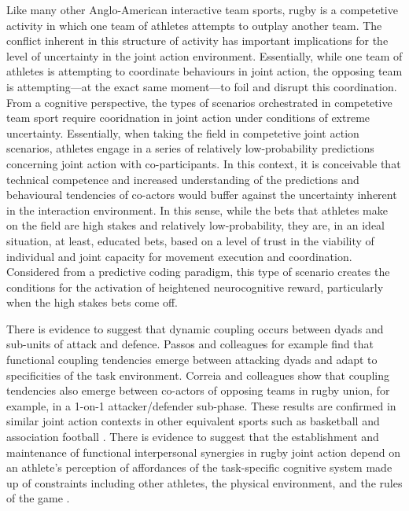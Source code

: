 Like many other Anglo-American interactive team sports, rugby is a competetive activity in which one team of athletes attempts to outplay another team.  The conflict inherent in this structure of activity has important implications for the level of uncertainty in the joint action environment.  Essentially, while one team of athletes is attempting to coordinate behaviours in joint action, the opposing team is attempting---at the exact same moment---to foil and disrupt this coordination.  From a cognitive perspective, the types of scenarios orchestrated in competetive team sport require cooridnation in joint action under conditions of extreme uncertainty.  Essentially, when taking the field in competetive joint action scenarios, athletes engage in a series of relatively low-probability predictions concerning joint action with co-participants.  In this context, it is conceivable that technical competence and increased understanding of the predictions and behavioural tendencies of co-actors would buffer against the uncertainty inherent in the interaction environment.  In this sense, while the bets that athletes make on the field are high stakes and relatively low-probability, they are, in an ideal situation, at least, educated bets, based on a level of trust in the viability of individual and joint capacity for movement execution and coordination.  Considered from a predictive coding paradigm, this type of scenario creates the conditions for the activation of heightened neurocognitive reward, particularly when the high stakes bets come off.

There is evidence to suggest that dynamic coupling occurs between dyads and sub-units of attack and defence\citep{Passos2011,Correia2014}.  Passos and colleagues \textcite{Passos2011} for example find that functional coupling tendencies emerge between attacking dyads and adapt to specificities of the task environment.  Correia and colleagues \textcite{Correia2014} show that coupling tendencies also emerge between co-actors of opposing teams in rugby union, for example, in a 1-on-1 attacker/defender sub-phase.  These results are confirmed in similar joint action contexts in other equivalent sports such as basketball and association football \citep{Duarte2013}. There is evidence to suggest that the establishment and maintenance of functional interpersonal synergies in rugby joint action depend on an athlete's perception of affordances of the task-specific cognitive system made up of constraints including other athletes, the physical environment, and the rules of the game \citep{Passos2012}.

